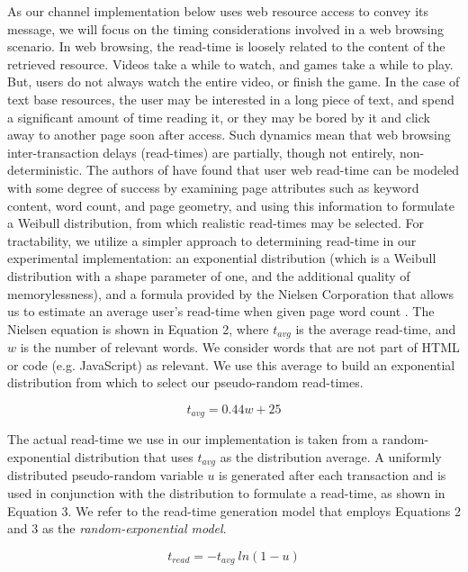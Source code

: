 \documentclass[10pt, conference]{IEEEtran}
\begin{document}
As our channel implementation below uses web resource access to convey its message, we will focus on the timing considerations involved in a web browsing scenario.  In web browsing, the read-time is loosely related to the content of the retrieved resource.  Videos take a while to watch, and games take a while to play.  But, users do not always watch the entire video, or finish the game.  In the case of text base resources, the user may be interested in a long piece of text, and spend a significant amount of time reading it, or they may be bored by it and click away to another page soon after access.  Such dynamics mean that web browsing inter-transaction delays (read-times) are partially, though not entirely, non-deterministic.  The authors of \cite{Liu10} have found that user web read-time can be modeled with some degree of success by examining page attributes such as keyword content, word count, and page geometry, and using this information to formulate a Weibull distribution, from which realistic read-times may be selected.  For tractability, we utilize a simpler approach to determining read-time in our experimental implementation: an exponential distribution (which is a Weibull distribution with a shape parameter of one, and the additional quality of memorylessness), and a formula provided by the Nielsen Corporation that allows us to estimate an average user's read-time when given page word count \cite{Nielsen08}.  The Nielsen equation is shown in Equation 2, where $t_{avg}$ is the average read-time, and $w$ is the number of relevant words.  We consider words that are not part of HTML or code (e.g. JavaScript) as relevant.  We use this average to build an exponential distribution from which to select our pseudo-random read-times.

\begin{equation}
t_{avg} = 0.44w + 25
\end{equation}

The actual read-time we use in our implementation is taken from a random-exponential distribution that uses $t_{avg}$ as the distribution average.  A uniformly distributed pseudo-random variable $u$ is generated after each transaction and is used in conjunction with the distribution to formulate a read-time, as shown in Equation 3.  We refer to the read-time generation model that employs Equations 2 and 3 as the {\em random-exponential model}.

\begin{equation}
t_{read} = -t_{avg}\ ln(1 - u)
\end{equation}
\end{document}
